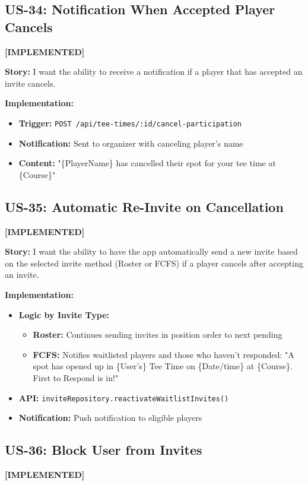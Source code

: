 \documentclass[11pt,a4paper]{article}
\newcommand{\implemented}{\textcolor{implemented}{\textbf{[IMPLEMENTED]}}}
\begin{document}
\subsection{US-34: Notification When Accepted Player Cancels}
\implemented

\textbf{Story:} I want the ability to receive a notification if a player that has accepted an invite cancels.

\textbf{Implementation:}
\begin{itemize}[leftmargin=*]
  \item \textbf{Trigger:} \texttt{POST /api/tee-times/:id/cancel-participation}
  \item \textbf{Notification:} Sent to organizer with canceling player's name
  \item \textbf{Content:} "\{PlayerName\} has cancelled their spot for your tee time at \{Course\}"
\end{itemize}

\subsection{US-35: Automatic Re-Invite on Cancellation}
\implemented

\textbf{Story:} I want the ability to have the app automatically send a new invite based on the selected invite method (Roster or FCFS) if a player cancels after accepting an invite.

\textbf{Implementation:}
\begin{itemize}[leftmargin=*]
  \item \textbf{Logic by Invite Type:}
    \begin{itemize}
      \item \textbf{Roster:} Continues sending invites in position order to next pending
      \item \textbf{FCFS:} Notifies waitlisted players and those who haven't responded: "A spot has opened up in \{User's\} Tee Time on \{Date/time\} at \{Course\}. First to Respond is in!"
    \end{itemize}
  \item \textbf{API:} \texttt{inviteRepository.reactivateWaitlistInvites()}
  \item \textbf{Notification:} Push notification to eligible players
\end{itemize}

\subsection{US-36: Block User from Invites}
\implemented
\end{document}
